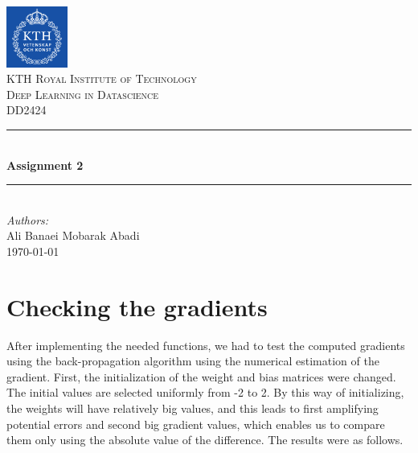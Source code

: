 \documentclass[a4paper]{article}
\begin{document}
\begin{titlepage}

\newcommand{\HRule}{\rule{\linewidth}{0.5mm}} 							%
\center 
 
 

\includegraphics[width=0.15\textwidth]{images/kth_logo.png}\\[0.5cm] 	%

\textsc{\LARGE KTH Royal Institute of Technology}\\[1cm]

\textsc{\Large Deep Learning in Datascience}\\[0.2cm]
\textsc{\large DD2424}\\[1cm] 										%
\HRule \\[0.8cm]
{ \huge \bfseries Assignment 2}\\[0.7cm]								%
\HRule \\[2cm]
\large
\emph{Authors:}\\
Ali Banaei Mobarak Abadi\\[1.5cm]													%
{\large \today}\\[5cm]

\vfill 
\end{titlepage}


\section{Checking the gradients}

After implementing the needed functions, we had to test the computed gradients using the back-propagation algorithm using the numerical estimation of the gradient. First, the initialization of the weight and bias matrices were changed. The initial values are selected uniformly from -2 to 2. By this way of initializing, the weights will have relatively big values, and this leads to first amplifying potential errors and second big gradient values, which enables us to compare them only using the absolute value of the difference. The results were as follows.
\end{document}
